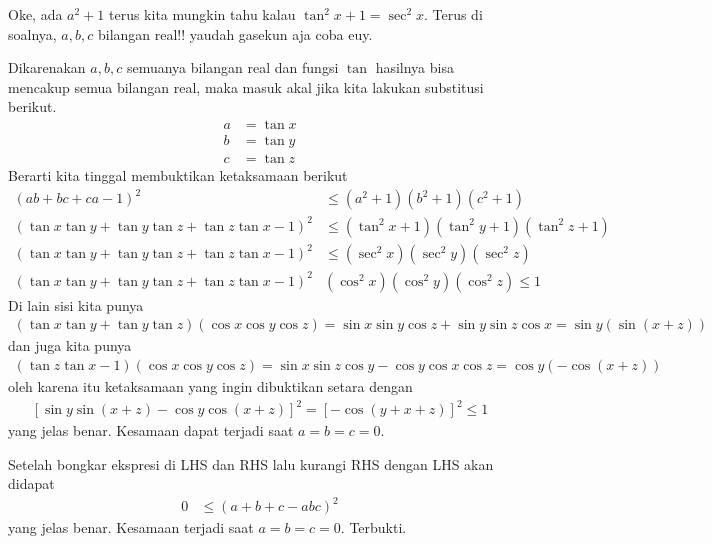 
\begin{remark*}[Motivasi]
Oke, ada $a^2+1$ terus kita mungkin tahu kalau $\tan^2 x + 1 = \sec ^2 x$. Terus di soalnya, $a,b,c$ bilangan real!! yaudah gasekun aja coba euy.
\end{remark*}
\begin{solusi}[Solusi 1.]
Dikarenakan $a,b,c$ semuanya bilangan real dan fungsi $\tan$ hasilnya bisa mencakup semua bilangan real, maka masuk akal jika kita lakukan substitusi berikut.
\begin{align*}
a &= \tan x \\
b &= \tan y \\
c &= \tan z
\end{align*}
Berarti kita tinggal membuktikan ketaksamaan berikut
\begin{align*}
(ab+bc+ca-1)^2 &\leq (a^2+1)(b^2+1)(c^2+1)\\
(\tan x \tan y + \tan y \tan z + \tan z \tan x - 1)^2 &\leq (\tan^2 x + 1)(\tan^2 y + 1)(\tan^2 z + 1)\\
(\tan x \tan y + \tan y \tan z + \tan z \tan x - 1)^2 &\leq (\sec^2 x)(\sec^2 y)(\sec^2 z) \\
(\tan x \tan y + \tan y \tan z + \tan z \tan x - 1)^2& (\cos^2 x)(\cos^2 y)(\cos^2 z) \leq 1
\end{align*}
Di lain sisi kita punya
\begin{align*}
(\tan x \tan y + \tan y \tan z)(\cos x \cos y \cos z) = \sin x \sin y \cos z + \sin y \sin z \cos x = \sin y (\sin(x+z))
\end{align*}
dan juga kita punya
\begin{align*}
(\tan z \tan x - 1)(\cos x \cos y \cos z) = \sin x \sin z \cos y - \cos y \cos x \cos z = \cos y (-\cos(x+z))
\end{align*}
oleh karena itu ketaksamaan yang ingin dibuktikan setara dengan
\begin{align*}
\left[ \sin y \sin(x+z) - \cos y \cos(x+z) \right]^2 = \left[ -\cos(y+x+z) \right]^2 \leq 1
\end{align*}
yang jelas benar. Kesamaan dapat terjadi saat $a=b=c=0$.
\end{solusi}

\begin{solusi}
Setelah bongkar ekspresi di LHS dan RHS lalu kurangi RHS dengan LHS akan didapat
\begin{align*}
0 &\le (a+b+c - abc)^2
\end{align*}
yang jelas benar. Kesamaan terjadi saat $a=b=c=0$. Terbukti.
\end{solusi}

